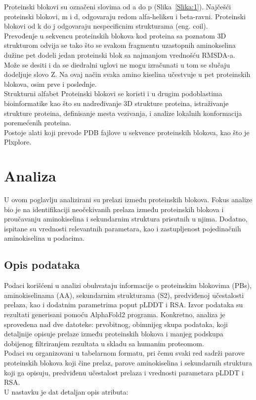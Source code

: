 \documentclass[a4paper,12pt]{article}
\begin{document}
\newpage
Proteinski blokovi su označeni slovima od a do p (Slika~\ref{Slika:1}). Najčešći proteinski blokovi, m i d, odgovaraju redom alfa-heliksu i beta-ravni. Proteinski blokovi od k do j odgovaraju nespecificnim strukturama (eng. coil). \\
Prevođenje u sekvencu proteinskih blokova kod proteina sa poznatom 3D strukturom odvija se tako što se svakom fragmentu uzastopnih aminokselina dužine pet dodeli jedan proteinski blok sa najmanjom vrednošću RMSDA-a. Može se desiti i da se diedralni uglovi ne mogu izračunati u tom se slučaju dodeljuje slovo Z. Na ovaj način svaka amino kiselina učestvuje u pet proteinskih blokova, osim prve i poslednje. \\
Strukturni alfabet Proteinski blokovi se koristi i u drugim podoblastima bioinformatike kao što su nadređivanje 3D strukture proteina, istraživanje strukture proteina, definisanje mesta vezivanja, i analize lokalnih konformacija poremećenih proteina. \\
Postoje alati koji prevode PDB fajlove u sekvence proteinskih blokova, kao što je Plxplore.
\newpage
\section{Analiza}
U ovom poglavlju analizirani su prelazi između proteinskih blokova. Fokus analize bio je na identifikaciji neočekivanih prelaza između proteinskih blokova i proučavanju aminokiselina i sekundarnim struktura prisutnih u njima. Dodatno, ispitane su vrednosti relevantnih parametara, kao i zastupljenost pojedinačnih aminokiselina u podacima.

\subsection{Opis podataka}
Podaci korišćeni u analizi obuhvataju informacije o proteinskim blokovima (PBs), aminokiselinama (AA), sekundarnim strukturama (S2), predviđenoj učestalosti prelaza, kao i dodatnim parametrima poput pLDDT i RSA. Izvor podataka su rezultati generisani pomoću AlphaFold2 programa. Konkretno, analiza je sprovedena nad dve datoteke: prvobitnog, obimnijeg skupa podataka, koji detaljnije opisuje prelaze između proteinskih blokova i manjeg podskupa dobijenog filtriranjem rezultata u skladu sa humanim proteomom. \\
Podaci su organizovani u tabelarnom formatu, pri čemu svaki red sadrži parove proteinskih blokova koji čine prelaz, parove aminokiselina i sekundarnih struktura koji ga opisuju, predviđenu učestalost prelaza i vrednosti parametara pLDDT i RSA.
\\
U nastavku je dat detaljan opis atributa:
\end{document}
